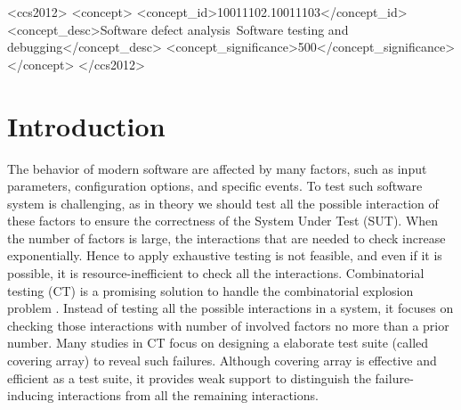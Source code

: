 \documentclass{sig-alternate-05-2015}
\begin{document}
\begin{CCSXML}
<ccs2012>
<concept>
<concept_id>10011102.10011103</concept_id>
<concept_desc>Software defect analysis~Software testing and debugging</concept_desc>
<concept_significance>500</concept_significance>
</concept>
</ccs2012>
\end{CCSXML}


%
%


%
%

%
%
\printccsdesc




\section{Introduction}\label{sec:intro}
The behavior of modern software are affected by many factors, such as input parameters, configuration options, and specific events. To test such software system is challenging, as in theory we should test all the possible interaction of these factors to ensure the correctness of the System Under Test (SUT)\cite{song2012itree}. When the number of factors is large, the interactions that are needed to check increase exponentially. Hence to apply exhaustive testing is not feasible, and even if it is possible, it is resource-inefficient to check all the interactions. Combinatorial testing (CT) is a promising solution to handle the combinatorial explosion problem \cite{kuhn2002investigation,kuhn2004software}. Instead of testing all the possible interactions in a system, it focuses on checking those interactions with number of involved factors no more than a prior number. Many studies in CT focus on designing a elaborate test suite (called covering array) to reveal such failures. Although covering array is effective and efficient as a test suite, it provides weak support to distinguish the failure-inducing interactions from all the remaining interactions.
\end{document}
